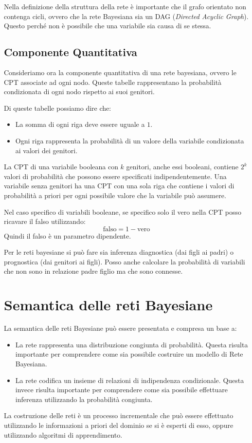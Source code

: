 Nella definizione della struttura della rete è importante che il grafo orientato
non contenga cicli, ovvero che la rete Bayesiana sia un DAG (\textit{Directed Acyclic
    Graph}). Questo perché non è possibile che una variabile sia causa di se stessa.

\subsection{Componente Quantitativa}
Consideriamo ora la componente quantitativa di una rete bayesiana, ovvero le CPT
associate ad ogni nodo. Queste tabelle rappresentano la probabilità condizionata
di ogni nodo rispetto ai suoi genitori.

Di queste tabelle possiamo dire che:
\begin{itemize}
    \item La somma di ogni riga deve essere uguale a $1$.
    \item Ogni riga rappresenta la probabilità di un valore della variabile
          condizionata ai valori dei genitori.
\end{itemize}
La CPT di una variabile booleana con $k$ genitori, anche essi booleani, contiene
$2^k$ valori di probabilità che possono essere specificati indipendentemente.
Una variabile senza genitori ha una CPT con una sola riga che contiene i valori
di probabilità a priori per ogni possibile valore che la variabile può assumere.
\begin{nota}
    Nel caso specifico di variabili booleane, se specifico solo il vero nella
    CPT posso ricavare il falso utilizzando:
    \begin{equation*}
        \text{falso} = 1 - \text{vero}
    \end{equation*}
    Quindi il falso è un parametro dipendente.
\end{nota}
Per le reti bayesiane si può fare sia inferenza diagnostica (dai figli ai padri)
o prognostica (dai genitori ai figli). Posso anche calcolare la probabilità di
variabili che non sono in relazione padre figlio ma che sono connesse.
\section{Semantica delle reti Bayesiane}
La semantica delle reti Bayesiane può essere presentata e compresa un base a:
\begin{itemize}
    \item La rete rappresenta una distribuzione congiunta di probabilità. Questa
          risulta importante per comprendere come sia possibile costruire un
          modello di Rete Bayesiana.
    \item La rete codifica un insieme di relazioni di indipendenza condizionale.
          Questa invece risulta importante per comprendere come sia possibile
          effettuare inferenza utilizzando la probabilità congiunta.
\end{itemize}
La costruzione delle reti è un processo incrementale che può essere effettuato
utilizzando le informazioni a priori del dominio se si è esperti di esso, oppure
utilizzando algoritmi di apprendimento.
